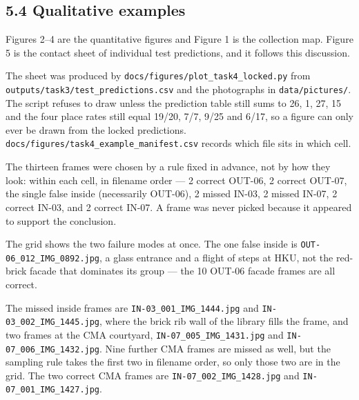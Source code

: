 \documentclass[11pt,a4paper]{article}
\begin{document}
\subsection{5.4 Qualitative examples}\label{qualitative-examples}

Figures 2--4 are the quantitative figures and Figure 1 is the collection map. Figure 5 is the contact sheet of individual test predictions, and it follows this discussion.

The sheet was produced by \texttt{docs/\allowbreak{}figures/\allowbreak{}plot\_\allowbreak{}task4\_\allowbreak{}locked.py} from \texttt{outputs/\allowbreak{}task3/\allowbreak{}test\_\allowbreak{}predictions.csv} and the photographs in \texttt{data/\allowbreak{}pictures/\allowbreak{}}. The script refuses to draw unless the prediction table still sums to 26, 1, 27, 15 and the four place rates still equal 19/20, 7/7, 9/25 and 6/17, so a figure can only ever be drawn from the locked predictions. \texttt{docs/\allowbreak{}figures/\allowbreak{}task4\_\allowbreak{}example\_\allowbreak{}manifest.csv} records which file sits in which cell.

The thirteen frames were chosen by a rule fixed in advance, not by how they look: within each cell, in filename order --- 2 correct OUT-06, 2 correct OUT-07, the single false inside (necessarily OUT-06), 2 missed IN-03, 2 missed IN-07, 2 correct IN-03, and 2 correct IN-07. A frame was never picked because it appeared to support the conclusion.

The grid shows the two failure modes at once. The one false inside is \texttt{OUT-\allowbreak{}06\_\allowbreak{}012\_\allowbreak{}IMG\_\allowbreak{}0892.jpg}, a glass entrance and a flight of steps at HKU, not the red-brick facade that dominates its group --- the 10 OUT-06 facade frames are all correct.

The missed inside frames are \texttt{IN-\allowbreak{}03\_\allowbreak{}001\_\allowbreak{}IMG\_\allowbreak{}1444.jpg} and \texttt{IN-\allowbreak{}03\_\allowbreak{}002\_\allowbreak{}IMG\_\allowbreak{}1445.jpg}, where the brick rib wall of the library fills the frame, and two frames at the CMA courtyard, \texttt{IN-\allowbreak{}07\_\allowbreak{}005\_\allowbreak{}IMG\_\allowbreak{}1431.jpg} and \texttt{IN-\allowbreak{}07\_\allowbreak{}006\_\allowbreak{}IMG\_\allowbreak{}1432.jpg}. Nine further CMA frames are missed as well, but the sampling rule takes the first two in filename order, so only those two are in the grid. The two correct CMA frames are \texttt{IN-\allowbreak{}07\_\allowbreak{}002\_\allowbreak{}IMG\_\allowbreak{}1428.jpg} and \texttt{IN-\allowbreak{}07\_\allowbreak{}001\_\allowbreak{}IMG\_\allowbreak{}1427.jpg}.
\end{document}
